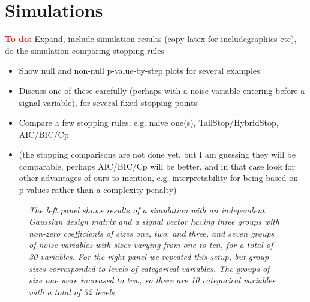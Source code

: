 \documentclass{imsart}
\newcommand{\todo}{\textcolor{red}{\textbf{To do: }}}
\begin{document}
\section{Simulations}
\label{sec:simulations}

\todo Expand, include simulation results (copy latex for
includegraphics etc), do the simulation comparing stopping rules

\begin{itemize}
  \item Show null and non-null p-value-by-step plots for several examples
  \item Discuss one of these carefully (perhaps with a noise variable
    entering before a signal variable), for several fixed stopping points
  \item Compare a few stopping rules, e.g. naive one(s),
    TailStop/HybridStop, AIC/BIC/Cp
  \item (the stopping comparisons are not done yet, but I am guessing
    they will be comparable, perhaps AIC/BIC/Cp will be better, and in
    that case look for other advantages of ours to mention,
    e.g. interpretability for being based on p-values rather than a
    complexity penalty)

\end{itemize}


\begin{figure}
\begin{center}
\hspace{-15pt}
\caption{\small \it The left panel shows results of a simulation with
  an independent Gaussian design matrix and a signal vector having
  three groups with non-zero coefficients of sizes one, two, and
  three, and seven groups of noise variables with sizes varying from
  one to ten, for a total of 30 variables. For the right panel we
  repeated this setup, but group sizes corresponded to levels of
  categorical variables. The groups of size one were increased to two,
so there are 10 categorical variables with a total of 32 levels.}
\end{center}
\end{figure}




\end{document}
